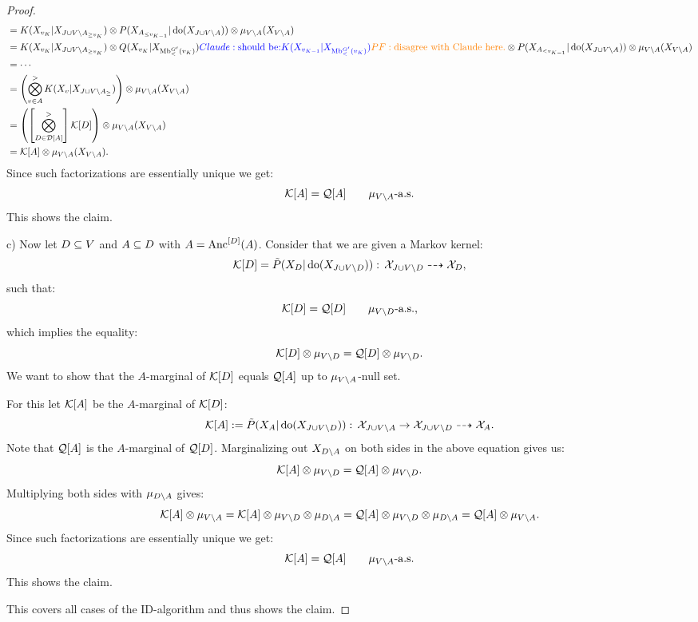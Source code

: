 \begin{Thm}
\begin{proof}
\begin{align*}
           & = K(X_{v_K}|X_{J \cup V \setminus A_{\ge v_K}}) \otimes P(X_{A_{\le v_{K-1}}}|\operatorname{do}(X_{J \cup V \setminus A})) \otimes \mu_{V \setminus A}(X_{V \setminus A}) \\
       & = K(X_{v_K}|X_{J \cup V \setminus A_{\ge v_K}}) \otimes Q(X_{v_K}|X_{\mathrm{Mb}^{G'}_<(v_K)}) {\color{blue}Claude: \text{should be:} K(X_{v_{K-1}}|X_{\mathrm{Mb}^{G'}_<(v_K)})}{\color{orange}{PF: \text{disagree with Claude here.}}} \otimes P(X_{A_{< v_{K-1}}}|\operatorname{do}(X_{J \cup V \setminus A})) \otimes \mu_{V \setminus A}(X_{V \setminus A}) \\
           & = \cdots \\
           & = \left ( \bigotimes_{v \in A}^> K(X_v|X_{J \cup V \setminus A_\ge}) \right ) \otimes \mu_{V \setminus A}(X_{V \setminus A})\\
           &=  \left ( \left [ \bigotimes_{D \in \mathcal{D}[A]}^> \right ] \mathcal{K}[D] \right )\otimes \mu_{V \setminus A}(X_{V \setminus A})\\
           &= \mathcal{K}[A] \otimes \mu_{V \setminus A}(X_{V \setminus A}).
        \end{align*}
        Since such factorizations are essentially unique we get:
               \[ \mathcal{K}[A] = \mathcal{Q}[A] \qquad \mu_{V\setminus A}\text{-a.s.} \]
        This shows the claim.

       c) Now let $D \subseteq V$ and $A \subseteq D$ with $A=\mathrm{Anc}^{[D]}(A)$. Consider that we are given a Markov kernel:
       \[ \mathcal{K}[D]=\tilde P(X_{D}|\operatorname{do}(X_{J \cup V \setminus D})) :\, \mathcal{X}_{J \cup V \setminus D} \dashrightarrow \mathcal{X}_{D}, \]
        such that:
       \[ \mathcal{K}[D] = \mathcal{Q}[D]\qquad \mu_{V\setminus D}\text{-a.s.,}  \]
       which implies the equality:
            \[  \mathcal{K}[D] \otimes \mu_{V\setminus D} = \mathcal{Q}[D]\otimes \mu_{V\setminus D}. \]
            We want to show that the $A$-marginal of $\mathcal{K}[D]$ equals $\mathcal{Q}[A]$ up to $\mu_{V\setminus A}$-null set.

        For this let $\mathcal{K}[A]$ be the $A$-marginal of $\mathcal{K}[D]$:
       \[ \mathcal{K}[A]:=\tilde P(X_A|\operatorname{do}(X_{J \cup V \setminus D})) :\, \mathcal{X}_{J \cup V \setminus A} \to \mathcal{X}_{J \cup V \setminus D} \dashrightarrow \mathcal{X}_A. \]
        Note that $\mathcal{Q}[A]$ is the $A$-marginal of $\mathcal{Q}[D]$.
        Marginalizing out $X_{D \setminus A}$ on both sides in the above equation gives us:
         \[ \mathcal{K}[A] \otimes \mu_{V\setminus D} = \mathcal{Q}[A]\otimes \mu_{V\setminus D}. \]
        Multiplying both sides with $\mu_{D \setminus A}$ gives:
        \[ \mathcal{K}[A] \otimes \mu_{V\setminus A} = \mathcal{K}[A] \otimes \mu_{V\setminus D} \otimes \mu_{D \setminus A} = \mathcal{Q}[A]\otimes \mu_{V\setminus D} \otimes \mu_{D \setminus A} = \mathcal{Q}[A] \otimes \mu_{V\setminus A}. \]
        Since such factorizations are essentially unique we get:
               \[ \mathcal{K}[A] = \mathcal{Q}[A] \qquad \mu_{V\setminus A}\text{-a.s.} \]
        This shows the claim.

        This covers all cases of the ID-algorithm and thus shows the claim.
    \end{proof}
\end{Thm}



